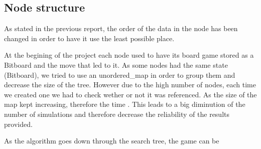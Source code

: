 \subsection{Node structure}

As stated in the previous report, the order of the data in the node has been changed in order to have it use the least possible place.

At the begining of the project each node used to have its board game stored as a Bitboard and the move that led to it. As some nodes had the same state (Bitboard), we tried to use an unordered\_map in order to group them and decrease the size of the tree. However due to the high number of nodes, each time we created one we had to check wether or not it was referenced. As the size of the map kept increasing, therefore the time . This leads to a big diminution of the number of simulations and therefore decrease the reliability of the results provided.

As the algorithm goes down through the search tree, the game can be 